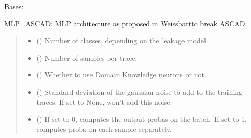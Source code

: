 \documentclass[letterpaper,10pt,english]{sphinxmanual}
\begin{document}

\begin{fulllineitems}
\label{\detokenize{MLSCAlib.Architectures:MLSCAlib.Architectures.torch_models.MLP_ASCAD}}
\pysigstartsignatures
{}
\pysigstopsignatures
\sphinxAtStartPar
Bases: 

\sphinxAtStartPar
MLP\_ASCAD: MLP architecture as proposed in Weissbart\sphinxfootnotemark[7] to break ASCAD.
\begin{quote}\begin{description}
\begin{itemize}
\item {} 
\sphinxAtStartPar
{} () \textendash{} Number of classes, depending on the leakage model.

\item {} 
\sphinxAtStartPar
{} () \textendash{} Number of samples per trace.

\item {} 
\sphinxAtStartPar
{} (\sphinxstyleliteralemphasis{\sphinxupquote{, }}) \textendash{} Whether to use Domain Knowledge neurons or not.

\item {} 
\sphinxAtStartPar
{} (\sphinxstyleliteralemphasis{\sphinxupquote{, }}) \textendash{} Standard deviation of the gaussian noise to add to the training traces. If set
to None, won’t add this noise.

\item {} 
\sphinxAtStartPar
{} (\sphinxstyleliteralemphasis{\sphinxupquote{, }}) \textendash{} If set to 0, computes the output probas on the batch. If set to 1, computes proba on
each sample separately.


\end{itemize}
\end{description}
\end{quote}
\end{fulllineitems}
\end{document}
